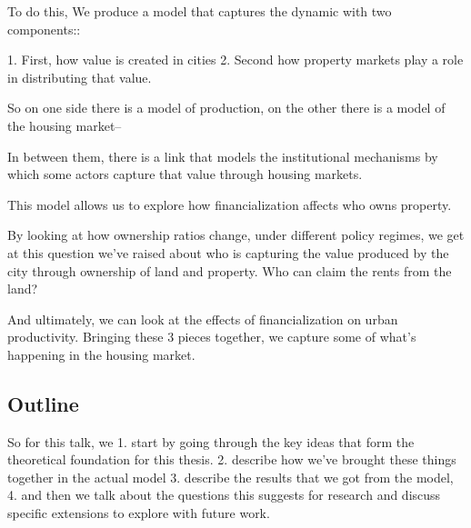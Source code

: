 \documentclass[]{article}
\begin{document}
To do this,  We produce a model that captures the dynamic with two components::

 1. First, how value is created in cities %
 2. Second how property markets play a role in distributing that value. %

So on one side there is a model of production, on the other there is a model of the housing market-- 

In between them, there is a link that models the institutional mechanisms by which some actors capture that value through housing markets.


This model allows us to explore  how financialization affects %
who owns property.

By looking at how ownership ratios change, under different policy regimes, 
we get at this question we've raised about who is capturing the value produced by the city through ownership of land and property.  Who can claim the rents from the land?

And ultimately, we can look at the effects of financialization on urban productivity.  
Bringing these 3 pieces together, we capture  some of what's happening in the housing market.



\subsection{Outline}

So for this talk, we  
1. start by going through the key ideas that form the theoretical foundation for this thesis. 
 2. describe how we've brought these things together in the actual model %
3. describe the results that we got from the model,
4. and then we talk about the questions this suggests for research and discuss specific extensions to explore with future work. 
\end{document}
